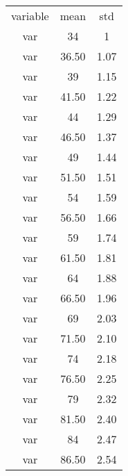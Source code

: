 \begin{table}[h]
\begin{center} \small
\begin{tabular}{ccc}
\hline 

variable & mean & std \\

var & 34 & 1 \\

var & 36.50 & 1.07 \\

var & 39 & 1.15 \\

var & 41.50 & 1.22 \\

var & 44 & 1.29 \\

var & 46.50 & 1.37 \\

var & 49 & 1.44 \\

var & 51.50 & 1.51 \\

var & 54 & 1.59 \\

var & 56.50 & 1.66 \\

var & 59 & 1.74 \\

var & 61.50 & 1.81 \\

var & 64 & 1.88 \\

var & 66.50 & 1.96 \\

var & 69 & 2.03 \\

var & 71.50 & 2.10 \\

var & 74 & 2.18 \\

var & 76.50 & 2.25 \\

var & 79 & 2.32 \\

var & 81.50 & 2.40 \\

var & 84 & 2.47 \\

var & 86.50 & 2.54 \\


\end{tabular}
\end{center}
\end{table}
